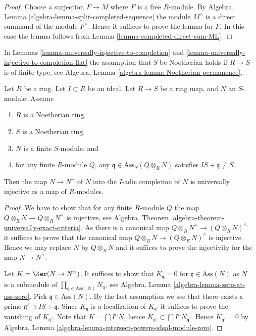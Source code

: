 \begin{proof}
Choose a surjection $F \to M$ where $F$ is a free $R$-module. By
Algebra, Lemma \ref{algebra-lemma-split-completed-sequence}
the module $M^\wedge$ is a direct summand of the module $F^\wedge$.
Hence it suffices to prove the lemma for $F$.
In this case the lemma follows from
Lemma \ref{lemma-completed-direct-sum-ML}.
\end{proof}

\noindent
In
Lemmas \ref{lemma-universally-injective-to-completion} and
\ref{lemma-universally-injective-to-completion-flat}
the assumption that $S$ be Noetherian holds if $R \to S$ is of finite type, see
Algebra, Lemma \ref{algebra-lemma-Noetherian-permanence}.

\begin{lemma}
\label{lemma-universally-injective-to-completion}
Let $R$ be a ring.
Let $I \subset R$ be an ideal.
Let $R \to S$ be a ring map, and $N$ an $S$-module.
Assume
\begin{enumerate}
\item $R$ is a Noetherian ring,
\item $S$ is a Noetherian ring,
\item $N$ is a finite $S$-module, and
\item for any finite $R$-module $Q$, any
$\mathfrak q \in \text{Ass}_S(Q \otimes_R N)$
satisfies $IS + \mathfrak q \not = S$.
\end{enumerate}
Then the map $N \to N^\wedge$ of $N$ into the $I$-adic completion of $N$
is universally injective as a map of $R$-modules.
\end{lemma}

\begin{proof}
We have to show that for any finite $R$-module $Q$ the map
$Q \otimes_R N \to Q \otimes_R N^\wedge$ is injective, see
Algebra, Theorem \ref{algebra-theorem-universally-exact-criteria}.
As there is a canonical map $Q \otimes_R N^\wedge \to (Q \otimes_R N)^\wedge$
it suffices to prove that the canonical map
$Q \otimes_R N \to (Q \otimes_R N)^\wedge$ is injective.
Hence we may replace $N$ by $Q \otimes_R N$ and it suffices to prove the
injectivity for the map $N \to N^\wedge$.

\medskip\noindent
Let $K = \Ker(N \to N^\wedge)$. It suffices to show that
$K_{\mathfrak q} = 0$ for $\mathfrak q \in \text{Ass}(N)$ as $N$ is a
submodule of $\prod_{\mathfrak q \in \text{Ass}(N)} N_{\mathfrak q}$, see
Algebra, Lemma \ref{algebra-lemma-zero-at-ass-zero}.
Pick $\mathfrak q \in \text{Ass}(N)$. By the last assumption we see that
there exists a prime $\mathfrak q' \supset IS + \mathfrak q$.
Since $K_{\mathfrak q}$ is a localization of $K_{\mathfrak q'}$
it suffices to prove the vanishing of $K_{\mathfrak q'}$.
Note that $K = \bigcap I^nN$, hence
$K_{\mathfrak q'} \subset \bigcap I^nN_{\mathfrak q'}$.
Hence $K_{\mathfrak q'} = 0$ by
Algebra, Lemma \ref{algebra-lemma-intersect-powers-ideal-module-zero}.
\end{proof}

